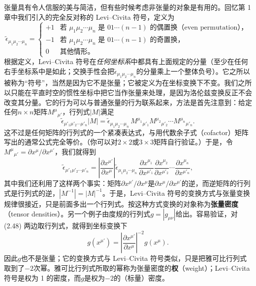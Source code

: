张量具有令人信服的美与简洁，但有些时候考虑非张量的对象是有用的。回忆第 1 章中我们引入的完全反对称的 Levi–Civita 符号，定义为
\begin{equation*}
\tilde\epsilon_{\mu_1\mu_2\cdots\mu_n}=
\begin{cases}
+1 & \text{若 $\mu_1\mu_2\cdots\mu_n$ 是 $01\cdots(n-1)$ 的偶置换（even permutation），}\\
-1 & \text{若 $\mu_1\mu_2\cdots\mu_n$ 是 $01\cdots(n-1)$ 的奇置换，}\\
0 & \text{其他情形。}
\end{cases}
\tag{2.65}
\end{equation*}
根据定义，Levi–Civita 符号在\emph{任何坐标系}中都具有上面规定的分量（至少在任何右手坐标系中是如此；交换手性会把$\tilde\epsilon_{\mu_1\mu_2\cdots\mu_n}$的分量乘上一个整体负号）。它之所以被称为“符号”，当然是因为它不是张量；它被定义为在坐标变换下不变。我们之所以只能在平直时空的惯性坐标中把它当作张量来处理，是因为洛伦兹变换反正不会改变其分量。它的行为可以与普通张量的行为联系起来，方法是首先注意到：给定任何$n\times n$矩阵$M^\mu{}_{\mu'}$，行列式$|M|$满足
\begin{equation*}
\tilde\epsilon_{\mu'_1\mu'_2\cdots\mu'_n}|M|=\tilde\epsilon_{\mu_1\mu_2\cdots\mu_n}\,M^{\mu_1}{}_{\mu'_1}M^{\mu_2}{}_{\mu'_2}\cdots M^{\mu_n}{}_{\mu'_n}.
\tag{2.66}
\end{equation*}
这不过是任何矩阵的行列式的一个紧凑表达式，与用代数余子式（cofactor）矩阵写出的通常公式完全等价。（你可以对$2\times2$或$3\times3$矩阵自行验证。）于是，令$M^\mu{}_{\mu'}=\partial x^\mu/\partial x^{\mu'}$，我们就得到
\begin{equation*}
\tilde\epsilon_{\mu'_1\mu'_2\cdots\mu'_n}=\left|\frac{\partial x^{\mu'}}{\partial x^\mu}\right|\tilde\epsilon_{\mu_1\mu_2\cdots\mu_n}\,\frac{\partial x^{\mu_1}}{\partial x^{\mu'_1}}\frac{\partial x^{\mu_2}}{\partial x^{\mu'_2}}\cdots\frac{\partial x^{\mu_n}}{\partial x^{\mu'_n}},
\tag{2.67}
\end{equation*}
其中我们还利用了这样两个事实：矩阵$\partial x^{\mu'}/\partial x^\mu$是$\partial x^\mu/\partial x^{\mu'}$的逆，而逆矩阵的行列式是行列式的逆，$|M^{-1}|=|M|^{-1}$。于是，Levi–Civita 符号的变换方式与张量变换规律很接近，只是前面多出一个行列式。按这种方式变换的对象称为\textbf{张量密度}（tensor densities）。另一个例子由度规的行列式$g=|g_{\mu\nu}|$给出。容易验证，对 (2.48) 两边取行列式，就得到坐标变换下
\begin{equation*}
g(x^{\mu'})=\left|\frac{\partial x^{\mu'}}{\partial x^\mu}\right|^{-2}g(x^\mu).
\tag{2.68}
\end{equation*}
因此$g$也不是张量；它的变换方式与 Levi–Civita 符号类似，只是把雅可比行列式取到了$-2$次幂。雅可比行列式所取的幂称为张量密度的\textbf{权}（weight）；Levi–Civita 符号是权为 1 的密度，而$g$是权为$-2$的（标量）密度。

